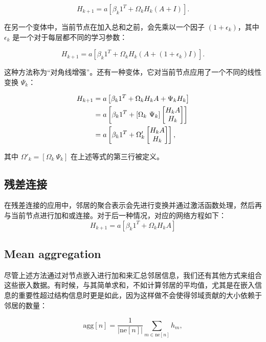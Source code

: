 \documentclass[lang=cn,newtx,10pt,scheme=chinese]{elegantbook}
\begin{document}
\begin{equation}
H_{k+1} = a \left[ \beta_k 1^T + \Omega_k H_k (A + I) \right]. 
\end{equation}

在另一个变体中，当前节点在加入总和之前，会先乘以一个因子 \((1 + \epsilon_k)\)，其中 \(\epsilon_k\) 是一个对于每层都不同的学习参数：

\begin{equation}
H_{k+1} = a \left[ \beta_{k} 1^T + \Omega_k H_k (A + (1 + \epsilon_k)I) \right]. 
\end{equation}

这种方法称为“对角线增强”。还有一种变体，它对当前节点应用了一个不同的线性变换 \(\Psi_k\)：


\begin{align}
H_{k+1} &= a \left[ \beta_{k} 1^T + \Omega_k H_k A + \Psi_k H_k \right] \notag \\
&= a \left[ \beta_{k} 1^T + \left[ \Omega_k \ \Psi_k \right] \begin{bmatrix} H_k A \\ H_k \end{bmatrix} \right] \notag \\
&= a \left[ \beta_{k} 1^T + \Omega'_k \begin{bmatrix} H_k A \\ H_k \end{bmatrix} \right], 
\end{align} 


其中 \(\Omega'_k = \left[ \Omega_k \ \Psi_k \right]\) 在上述等式的第三行被定义。

\subsection{残差连接}
在残差连接的应用中，邻居的聚合表示会先进行变换并通过激活函数处理，然后再与当前节点进行加和或连接。对于后一种情况，对应的网络方程如下：
\begin{equation}
H_{k+1} = a \left[ \beta_k 1^T + \Omega_k H_k A \right] 
\end{equation}
\subsection{Mean aggregation}
尽管上述方法通过对节点嵌入进行加和来汇总邻居信息，我们还有其他方式来组合这些嵌入数据。有时候，与其简单求和，不如计算邻居的平均值，尤其是在嵌入信息的重要性超过结构信息时更是如此，因为这样做不会使得邻域贡献的大小依赖于邻居的数量：

\begin{equation}
\text{agg}[n] = \frac{1}{|\text{ne}[n]|} \sum_{m \in \text{ne}[n]} h_m, 
\end{equation}
\end{document}
